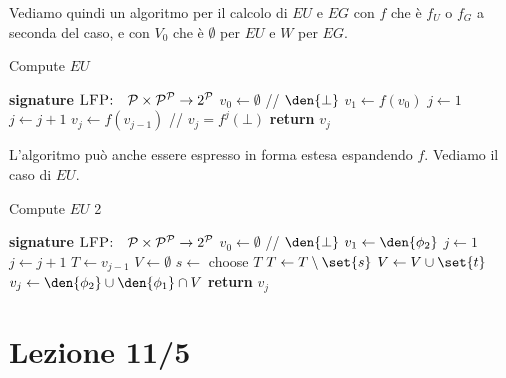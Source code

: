 Vediamo quindi un algoritmo per il calcolo di \(EU\) e \(EG\) con \(f\) che è \(f_U\) o \(f_G\) a seconda del caso, e con \(V_0\) che è \(\emptyset\) per \(EU\) e \(W\) per \(EG\).

\begin{algorithmdesc}{Compute \(EU\)}
  \begin{algorithmic}[1]
    \Statex{} \textbf{signature} \(\textsc{LFP:} \quad \mathcal{P} \times \mathcal{P}^{\mathcal{P}} \to 2^\mathcal{P} \)
      \State{} \(v_0 \gets \emptyset\) // \(\den{\bot}\)
      \State{} \(v_1 \gets f(v_0)\)
      \State{} \(j \gets 1\)
        \State{} \(j \gets j + 1\)
        \State{} \(v_{j} \gets f(v_{j-1})\) // \(v_j = f^j(\bot)\)
      \EndWhile{}
      \State{} \textbf{return} \(v_j\)
    \EndFunction{}
  \end{algorithmic}
\end{algorithmdesc}

L'algoritmo può anche essere espresso in forma estesa espandendo \(f\). Vediamo il caso di \(EU\).

\begin{algorithmdesc}{Compute \(EU\) 2}
  \begin{algorithmic}[1]
    \Statex{} \textbf{signature} \(\textsc{LFP:} \quad \mathcal{P} \times \mathcal{P}^{\mathcal{P}} \to 2^\mathcal{P} \)
      \State{} \(v_0 \gets \emptyset\) // \(\den{\bot}\)
      \State{} \(v_1 \gets \den{\phi_2}\)
      \State{} \(j \gets 1\)
        \State{} \(j \gets j + 1\)
        \State{} \(T \gets v_{j-1}\)
        \State{} \(V\gets \emptyset\)
          \State{} \(s \gets\) choose \(T\)
          \State{} \(T \gets T\setminus\set{s}\)
            \State{} \(V \gets V\cup\set{t}\)
          \EndFor{}
        \EndWhile{}
        \State{} \(v_{j} \gets \den{\phi_2} \cup \den{\phi_1} \cap V\)
      \EndWhile{}
      \State{} \textbf{return} \(v_j\)
    \EndFunction{}
  \end{algorithmic}
\end{algorithmdesc}

\chapter{Lezione 11/5}

